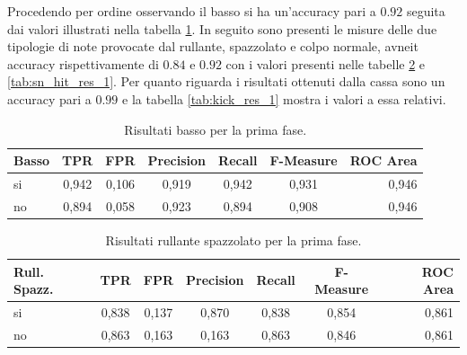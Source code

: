 Procedendo per ordine osservando il basso si ha un'accuracy pari a $0.92$ seguita dai valori illustrati nella tabella \ref{tab:cb_res_1}. In seguito sono presenti le misure delle due tipologie di note provocate dal rullante, spazzolato e colpo normale, avneit accuracy rispettivamente di $0.84$ e $0.92$ con i valori presenti nelle tabelle \ref{tab:sn_brush_res_1} e \ref{tab:sn_hit_res_1}. Per quanto riguarda i risultati ottenuti dalla cassa sono un accuracy pari a $0.99$ e la tabella \ref{tab:kick_res_1} mostra i valori a essa relativi.

\begin{table}[h!]
	\begin{center}
		\begin{tabular}{l|c|c|c|c|c|r} %
			\textbf{Basso} & \textbf{TPR} & \textbf{FPR} & \textbf{Precision} & \textbf{Recall} & \textbf{F-Measure} & \textbf{ROC Area}\\
			\hline
			si & 0,942 & 0,106 & 0,919 & 0,942 & 0,931 & 0,946 \\
			no & 0,894 & 0,058 & 0,923 & 0,894 & 0,908 & 0,946 \\
		\end{tabular}
		\caption{Risultati basso per la prima fase.}
		\label{tab:cb_res_1}
	\end{center}
\end{table}

\begin{table}[h!]
	\begin{center}
		\begin{tabular}{l|c|c|c|c|c|r} %
			\textbf{Rull. Spazz.} & \textbf{TPR} & \textbf{FPR} & \textbf{Precision} & \textbf{Recall} & \textbf{F-Measure} & \textbf{ROC Area}\\
			\hline
			si & 0,838 & 0,137 & 0,870 & 0,838 & 0,854 & 0,861 \\
			no & 0,863 & 0,163 & 0,163 & 0,863 & 0,846 & 0,861 \\
		\end{tabular}
		\caption{Risultati rullante spazzolato per la prima fase.}
		\label{tab:sn_brush_res_1}
	\end{center}
\end{table}

